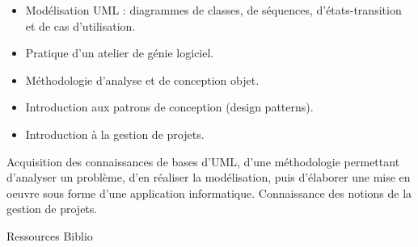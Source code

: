 \documentclass[10pt, a5paper]{report}
\begin{document}
{
\begin{itemize} 
  \item Modélisation UML : diagrammes de classes, de séquences, d'états-transition et de cas d'utilisation.
  \item Pratique d'un atelier de génie logiciel.
  \item Méthodologie d'analyse et de conception objet.
  \item Introduction aux patrons de conception (design patterns).
  \item Introduction à la gestion de projets.
\end{itemize} 
} 
{} 
{\begin{itemize} 
  \ObjItem Acquisition des connaissances de bases d'UML, d'une méthodologie permettant d'analyser un problème, d'en réaliser la modélisation, puis d'élaborer une mise en oeuvre sous forme d'une application informatique. 
  \ObjItem Connaissance des notions de la gestion de projets. 
\end{itemize} 
} 
{Ressources} 
{Biblio} 
 
\vfill
\end{document}
